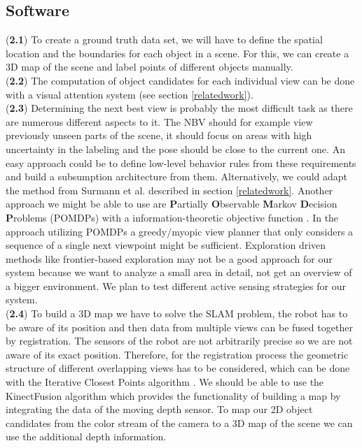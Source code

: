 \documentclass[a4paper,11pt,english]{article}
\begin{document}
\subsection{Software}
(\textbf{2.1}) To create a ground truth data set, we will have to define the spatial location and the boundaries for each object in a scene.
For this, we can create a 3D map of the scene and label points of different objects manually.\\
(\textbf{2.2}) The computation of object candidates for each individual view can be done with a visual attention system \cite{garcia2013computational} (see section \ref{relatedwork}).\\
(\textbf{2.3}) Determining the next best view is probably the most difficult task as there are numerous different aspects to it.
The NBV should for example view previously unseen parts of the scene, it should focus on areas with high uncertainty in the labeling and the pose should be close to the current one.
An easy approach could be to define low-level behavior rules from these requirements and build a subsumption architecture \cite{brooks1986robust} from them.
Alternatively, we could adapt the method from Surmann et al. \cite{surmann2003autonomous} described in section \ref{relatedwork}.
Another approach we might be able to use are \textbf{P}artially \textbf{O}bservable \textbf{M}arkov \textbf{D}ecision \textbf{P}roblems (POMDPs) with a information-theoretic objective function \cite{lauri2015planning}.
In the approach utilizing POMDPs a greedy/myopic view planner that only considers a sequence of a single next viewpoint might be sufficient. 
Exploration driven methods like frontier-based exploration may not be a good approach for our system because we want to analyze a small area in detail, not get an overview of a bigger environment.
We plan to test different active sensing strategies for our system.\\
(\textbf{2.4}) To build a 3D map we have to solve the SLAM problem, the robot has to be aware of its position and then data from multiple views can be fused together by registration.
The sensors of the robot are not arbitrarily precise so we are not aware of its exact position. Therefore, for the registration process the geometric structure of different overlapping views has to be considered, which can be done with the Iterative Closest Points algorithm \cite{surmann2003autonomous}.
We should be able to use the KinectFusion algorithm which provides the functionality of building a map by integrating the data of the moving depth sensor.
To map our 2D object candidates from the color stream of the camera to a 3D map of the scene we can use the additional depth information.
\end{document}
